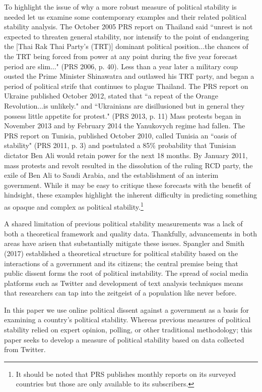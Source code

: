 \documentclass[12pt]{article}
\begin{document}
\begin{spacing}{1.5}
To highlight the issue of why a more robust measure of political stability is needed let us examine some contemporary examples and their related political stability analysis. The October 2005 PRS report on Thailand said ``unrest is not expected to threaten general stability, nor intensify to the point of endangering the [Thai Rak Thai Party's (TRT)] dominant political position...the chances of the TRT being forced from power at any point during the five year forecast period are slim..." (PRS 2006, p. 40). Less than a year later a military coup ousted the Prime Minister Shinawatra and outlawed his TRT party, and began a period of political strife that continues to plague Thailand. The PRS report on Ukraine published October 2012, stated that ``a repeat of the Orange Revolution...is unlikely." and ``Ukrainians are disillusioned but in general they possess little appetite for protest." (PRS 2013, p. 11) Mass protests began in November 2013 and by February 2014 the Yanukovych regime had fallen. The PRS report on Tunisia, published October 2010, called Tunisia an ``oasis of stability" (PRS 2011, p. 3) and postulated a 85\% probability that Tunisian dictator Ben Ali would retain power for the next 18 months. By January 2011, mass protests and revolt resulted in the dissolution of the ruling RCD party, the exile of Ben Ali to Saudi Arabia, and the establishment of an interim government. While it may be easy to critique these forecasts with the benefit of hindsight, these examples highlight the inherent difficulty in predicting something as opaque and complex as political stability.\footnote{It should be noted that PRS publishes monthly reports on its surveyed countries but those are only available to its subscribers.} 

A shared limitation of previous political stability measurements was a lack of both a theoretical framework and quality data. Thankfully, advancements in both areas have arisen that substantially mitigate these issues. Spangler and Smith (2017) established a theoretical structure for political stability based on the interactions of a government and its citizens; the central premise being that public dissent forms the root of political instability. The spread of social media platforms such as Twitter and development of text analysis techniques means that researchers can tap into the zeitgeist of a population like never before. 

In this paper we use online political dissent against a government as a basis for examining a country's political stability. Whereas previous measures of political stability relied on expert opinion, polling, or other traditional methodology; this paper seeks to develop a measure of political stability based on data collected from Twitter. 


\end{spacing}
\end{document}
